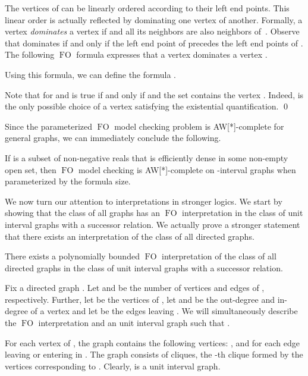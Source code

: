 \documentclass{CSML}
\newcommand{\FO}{\ensuremath{\operatorname{FO}}\xspace}
\theoremstyle{plain}\newtheorem{claim}[thm]{Claim}
\begin{document}
The vertices of  can be linearly ordered according to their left end points.
This linear order is actually reflected by dominating one vertex of another.
Formally, a vertex  {\em dominates} a vertex  if  and all its neighbors are also neighbors of~.
Observe that  dominates  if and only if the left end point of  precedes the left end points of .
The following \FO formula expresses that a vertex  dominates a vertex .

Using this formula, we can define the formula .

Note that  for  and  is true if and only if  and the set  contains the vertex .
Indeed,  is the only possible choice of a vertex satisfying the existential quantification.
\qed

Since the parameterized \FO model checking problem is AW[*]-complete
for general graphs, we can immediately conclude the following.
\begin{cor}
\label{cor-FO}
If  is a subset of non-negative reals that is efficiently dense in some non-empty open set,
then \FO model checking is AW[*]-complete on -interval graphs when
parameterized by the formula size.
\end{cor}

We now turn our attention to interpretations in stronger logics.
We start by showing that the class of all graphs
has an \FO interpretation in the class of unit interval graphs with a successor relation.
We actually prove a stronger statement that there exists an interpretation of the class of all directed graphs.

\begin{lem}
\label{lm-succ-lower}
There exists a polynomially bounded \FO interpretation of the class of all directed graphs
in the class of unit interval graphs with a successor relation.
\end{lem}

\proof
Fix a directed graph .
Let  and  be the number of vertices and edges of , respectively.
Further, let  be the vertices of ,
let  and  be the out-degree and in-degree of a vertex  and
let  be the edges leaving .
We will simultaneously describe the \FO interpretation  and an unit interval graph  such that .

For each vertex  of ,
the graph  contains the following  vertices:
,  and  for each edge  leaving or entering  in .
The graph  consists of  cliques, the -th clique formed by the  vertices corresponding to .
Clearly,  is a unit interval graph.
\end{document}
